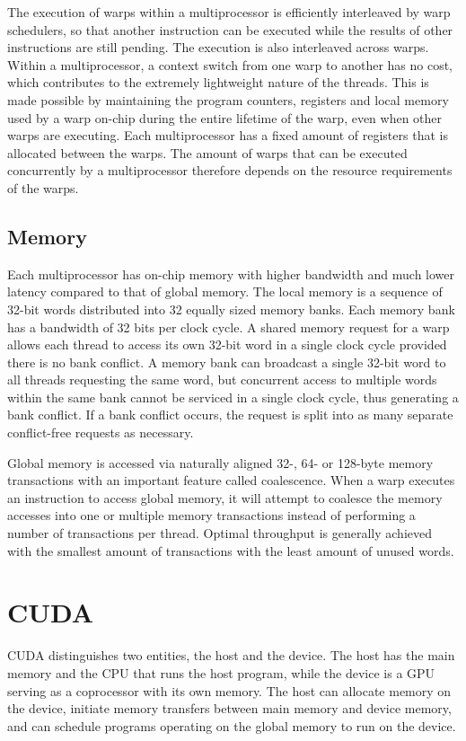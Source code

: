 The execution of warps within a multiprocessor is efficiently interleaved by warp schedulers, so that another instruction can be executed while the results of other instructions are still pending. The execution is also interleaved across warps. Within a multiprocessor, a context switch from one warp to another has no cost, which contributes to the extremely lightweight nature of the threads. This is made possible by maintaining the program counters, registers and local memory used by a warp on-chip during the entire lifetime of the warp, even when other warps are executing. Each multiprocessor has a fixed amount of registers that is allocated between the warps. The amount of warps that can be executed concurrently by a multiprocessor therefore depends on the resource requirements of the warps.

\subsection{Memory}

Each multiprocessor has on-chip memory with higher bandwidth and much lower latency compared to that of global memory. The local memory is a sequence of 32-bit words distributed into 32 equally sized memory banks. Each memory bank has a bandwidth of 32 bits per clock cycle. A shared memory request for a warp allows each thread to access its own 32-bit word in a single clock cycle provided there is no bank conflict. A memory bank can broadcast a single 32-bit word to all threads requesting the same word, but concurrent access to multiple words within the same bank cannot be serviced in a single clock cycle, thus generating a bank conflict. If a bank conflict occurs, the request is split into as many separate conflict-free requests as necessary.

Global memory is accessed via naturally aligned 32-, 64- or 128-byte memory transactions with an important feature called coalescence. When a warp executes an instruction to access global memory, it will attempt to coalesce the memory accesses into one or multiple memory transactions instead of performing a number of transactions per thread. Optimal throughput is generally achieved with the smallest amount of transactions with the least amount of unused words.

\section{CUDA}

CUDA distinguishes two entities, the host and the device. The host has the main memory and the CPU that runs the host program, while the device is a GPU serving as a coprocessor with its own memory. The host can allocate memory on the device, initiate memory transfers between main memory and device memory, and can schedule programs operating on the global memory to run on the device.

